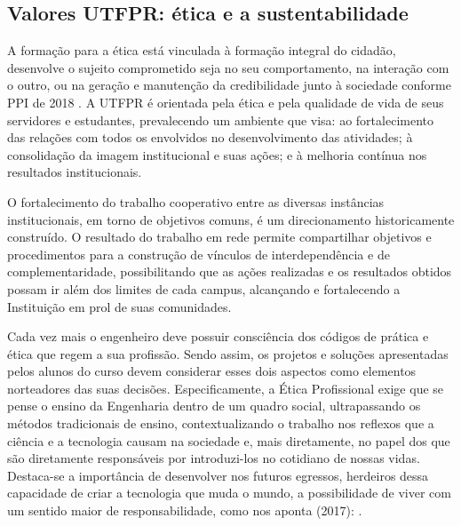 
\subsection{Valores UTFPR: ética e a sustentabilidade}

A formação para a ética está vinculada à formação integral do cidadão, desenvolve o sujeito comprometido seja no seu comportamento, na interação com o outro, ou na geração e manutenção da credibilidade junto à sociedade conforme PPI de 2018 \cite{ppiutfpr}.  A UTFPR é orientada pela ética e pela qualidade de vida de seus servidores e estudantes, prevalecendo um ambiente que visa: ao fortalecimento das relações com todos os envolvidos no desenvolvimento das atividades; à consolidação da imagem institucional e suas ações; e à melhoria contínua nos resultados institucionais.

O fortalecimento do trabalho cooperativo entre as diversas instâncias institucionais, em torno de objetivos comuns, é um direcionamento historicamente construído. O resultado do trabalho em rede permite compartilhar objetivos e procedimentos para a construção de vínculos de interdependência e de complementaridade, possibilitando que as ações realizadas e os resultados obtidos possam ir além dos limites de cada campus, alcançando e fortalecendo a Instituição em prol de suas comunidades.

Cada vez mais o engenheiro deve possuir consciência dos códigos de prática e ética que regem a sua profissão. Sendo assim, os projetos e soluções apresentadas pelos alunos do curso devem considerar esses dois aspectos como elementos norteadores das suas decisões. Especificamente, a Ética Profissional exige que se pense o ensino da Engenharia dentro de um quadro social, ultrapassando os métodos tradicionais de ensino, contextualizando o trabalho nos reflexos que a ciência e a tecnologia causam na sociedade e, mais diretamente, no papel dos que são diretamente responsáveis por introduzi-los no cotidiano de nossas vidas.  Destaca-se a importância de desenvolver nos futuros egressos, herdeiros dessa capacidade de criar a tecnologia que muda o mundo, a possibilidade de viver com um sentido maior de responsabilidade, como nos aponta  (2017): .

